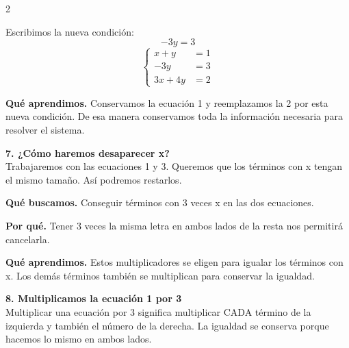 \documentclass[11pt,a4paper,landscape]{article}
\begin{document}
\begin{multicols*}{2}
\begin{minipage}{\linewidth}
\par\smallskip Escribimos la nueva condición:
\[-3y = 3\]
\[\left\{\begin{aligned}x + y &= 1\\-3y &= 3\\3x + 4y &= 2\end{aligned}\right.\]
\par\smallskip\textbf{Qué aprendimos.} Conservamos la ecuación 1 y reemplazamos la 2 por esta nueva condición. De esa manera conservamos toda la información necesaria para resolver el sistema.
\end{minipage}\par\medskip
\noindent\begin{minipage}{\linewidth}\textbf{7. ¿Cómo haremos desaparecer x?}\\[2pt]Trabajaremos con las ecuaciones 1 y 3. Queremos que los términos con x tengan el mismo tamaño. Así podremos restarlos.
\par\smallskip\textbf{Qué buscamos.} Conseguir términos con 3 veces x en las dos ecuaciones.
\par\smallskip\textbf{Por qué.} Tener 3 veces la misma letra en ambos lados de la resta nos permitirá cancelarla.
\par{}\par\smallskip
\par\smallskip\textbf{Qué aprendimos.} Estos multiplicadores se eligen para igualar los términos con x. Los demás términos también se multiplican para conservar la igualdad.
\end{minipage}\par\medskip
\noindent\begin{minipage}{\linewidth}\textbf{8. Multiplicamos la ecuación 1 por 3}\\[2pt]Multiplicar una ecuación por 3 significa multiplicar CADA término de la izquierda y también el número de la derecha. La igualdad se conserva porque hacemos lo mismo en ambos lados.

\end{minipage}
\end{multicols*}
\end{document}
